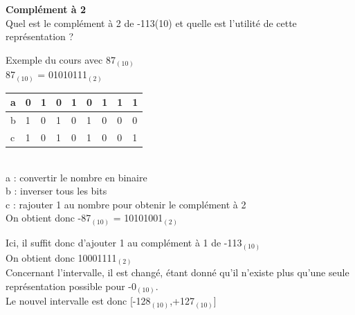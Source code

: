\begin{Exercice}[5 minutes] \textbf{Complément à 2}\\
    Quel est le complément à 2 de -113(10) et quelle est l'utilité de cette représentation ? \\

    \begin{conseil}
    
    Exemple du cours avec 87$_{(10)}$ \\
    
    87$_{(10)}$ = 01010111$_{(2)}$ \\
    
         \begin{tabular}{| p{1cm} | p{1cm} | p{1cm} | p{1cm} | p{1cm} | p{1cm} | p{1cm} | p{1cm} | p{1cm} |} 
            \hline
            a & 0 & 1 & 0 & 1 & 0 & 1 & 1 & 1 \\ [0.5ex] 
            \hline
            b & 1 & 0 & 1 & 0 & 1 & 0 & 0 & 0 \\ [0.5ex]
            \hline
            c & 1 & 0 & 1 & 0 & 1 & 0 & 0 & 1 \\ [0.5ex]
            \hline
        \end{tabular} \\
        
        a : convertir le nombre en binaire \\
        
        b : inverser tous les bits \\
        
        c : rajouter 1 au nombre pour obtenir le complément à 2 \\
        
        On obtient donc -87$_{(10)}$ = 10101001$_{(2)}$ \\
    \end{conseil}
    
    \begin{solution}
    	Ici, il suffit donc d'ajouter 1 au complément à 1 de -113$_{(10)}$ \\
    	
    	On obtient donc 10001111$_{(2)}$ \\
    	
    	Concernant l'intervalle, il est changé, étant donné qu'il n'existe plus qu'une seule représentation possible pour -0$_{(10)}$. \\
    	
    	Le nouvel intervalle est donc [-128$_{(10)}$,+127$_{(10)}$]
        
    \end{solution}
\end{Exercice}

